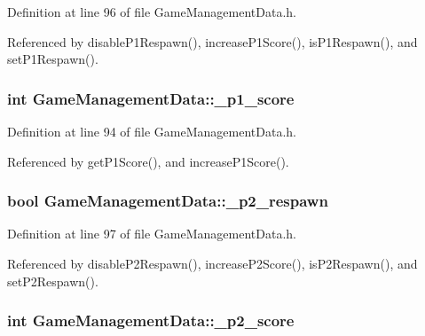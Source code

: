 Definition at line 96 of file Game\-Management\-Data.\-h.



Referenced by disable\-P1\-Respawn(), increase\-P1\-Score(), is\-P1\-Respawn(), and set\-P1\-Respawn().

\hypertarget{classGameManagementData_a76ffd3ea3cbcf32cd0c8e11e65e1932e}{
\subsubsection[{\-\_\-p1\-\_\-score}]{\setlength{\rightskip}{0pt plus 5cm}int Game\-Management\-Data\-::\-\_\-p1\-\_\-score\hspace{0.3cm}{\ttfamily [private]}}}\label{classGameManagementData_a76ffd3ea3cbcf32cd0c8e11e65e1932e}


Definition at line 94 of file Game\-Management\-Data.\-h.



Referenced by get\-P1\-Score(), and increase\-P1\-Score().

\hypertarget{classGameManagementData_a6515f5db7d5f36b3fd7175ed35109ab1}{
\subsubsection[{\-\_\-p2\-\_\-respawn}]{\setlength{\rightskip}{0pt plus 5cm}bool Game\-Management\-Data\-::\-\_\-p2\-\_\-respawn\hspace{0.3cm}{\ttfamily [private]}}}\label{classGameManagementData_a6515f5db7d5f36b3fd7175ed35109ab1}


Definition at line 97 of file Game\-Management\-Data.\-h.



Referenced by disable\-P2\-Respawn(), increase\-P2\-Score(), is\-P2\-Respawn(), and set\-P2\-Respawn().

\hypertarget{classGameManagementData_a40cf0c43247ade13defa7438f552e8ae}{
\subsubsection[{\-\_\-p2\-\_\-score}]{\setlength{\rightskip}{0pt plus 5cm}int Game\-Management\-Data\-::\-\_\-p2\-\_\-score\hspace{0.3cm}{\ttfamily [private]}}}\label{classGameManagementData_a40cf0c43247ade13defa7438f552e8ae}


